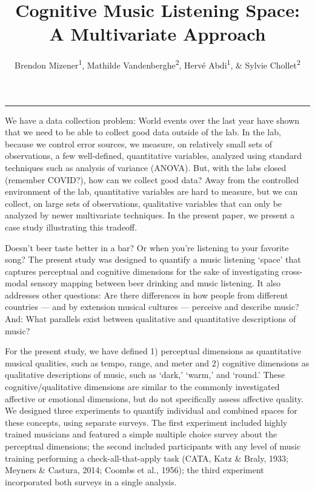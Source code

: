 \documentclass[
  english,
  man,floatsintext]{apa6}
\title{Cognitive Music Listening Space: A Multivariate Approach}
\author{Brendon Mizener\textsuperscript{1}, Mathilde Vandenberghe\textsuperscript{2}, Hervé Abdi\textsuperscript{1}, \& Sylvie Chollet\textsuperscript{2}}
\date{}
\affiliation{\vspace{0.5cm}\textsuperscript{1} University of Texas at Dallas\\\textsuperscript{2} Junia, Univ. Artois, Université de Liège, Univ. Littoral Côte d'Opale, UMRT 1158 BioEcoAgro, F-62000 Arras, France}
\begin{document}
\maketitle

\begin{center}\rule{0.5\linewidth}{0.5pt}\end{center}

We have a data collection problem: World events over the last year have shown that we need to be able to collect good data outside of the lab. In the lab, because we control error sources, we measure, on relatively small sets of observations, a few well-defined, quantitative variables, analyzed using standard techniques such as analysis of variance (ANOVA). But, with the labs closed (remember COVID?), how can we collect good data? Away from the controlled environment of the lab, quantitative variables are hard to measure, but we can collect, on large sets of observations, qualitative variables that can only be analyzed by newer multivariate techniques. In the present paper, we present a case study illustrating this tradeoff.

Doesn't beer taste better in a bar? Or when you're listening to your favorite song? The present study was designed to quantify a music listening `space' that captures perceptual and cognitive dimensions for the sake of investigating cross-modal sensory mapping between beer drinking and music listening. It also addresses other questions: Are there differences in how people from different countries --- and by extension musical cultures --- perceive and describe music? And: What parallels exist between qualitative and quantitative descriptions of music?

For the present study, we have defined 1) perceptual dimensions as quantitative musical qualities, such as tempo, range, and meter and 2) cognitive dimensions as qualitative descriptions of music, such as `dark,' `warm,' and `round.' These cognitive/qualitative dimensions are similar to the commonly investigated affective or emotional dimensions, but do not specifically assess affective quality. We designed three experiments to quantify individual and combined spaces for these concepts, using separate surveys. The first experiment included highly trained musicians and featured a simple multiple choice survey about the perceptual dimensions; the second included participants with any level of music training performing a check-all-that-apply task (CATA, Katz \& Braly, 1933; Meyners \& Castura, 2014; Coombs et al., 1956); the third experiment incorporated both surveys in a single analysis.
\end{document}
